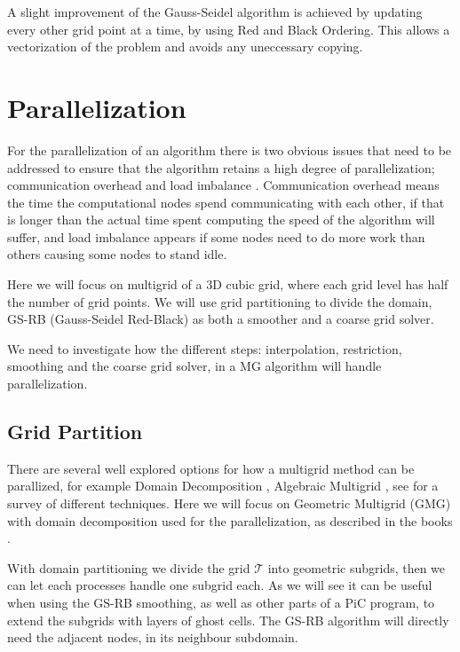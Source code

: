     A slight improvement of the Gauss-Seidel algorithm is achieved by updating
    every other grid point at a time, by using Red and Black Ordering.
    This allows a vectorization of the problem and avoids any uneccessary copying.

\section{Parallelization}
	For the parallelization of an algorithm there is two obvious issues that need
	to be addressed to ensure that the algorithm retains a high degree of parallelization;
	communication overhead and load imbalance \citep{hackbusch_multigrid_1982}.
  Communication overhead means the time the computational nodes spend communicating
  with each other, if that is longer than the actual time spent computing the speed
  of the algorithm will suffer, and load imbalance appears if some nodes need to
  do more work than others causing some nodes to stand idle.

	Here we will focus on multigrid of a 3D cubic grid, where each grid level has
  half the number of grid points. We will use grid
	partitioning to divide the domain, GS-RB (Gauss-Seidel Red-Black) as both a
	smoother and a coarse grid solver.

	We need to investigate how the different steps: interpolation, restriction,
	smoothing and the coarse grid solver, in a MG algorithm will handle parallelization.

	\subsection{Grid Partition}
		\label{sec:grid_partitioning}
		There are several well explored options for how a multigrid method can be
		parallized, for example Domain Decomposition \citep{arraras_domain_2015},
		Algebraic Multigrid \citep{stuben_review_2001}, see \citet{chow_survey_2006}
		for a survey of different techniques. Here we will focus on Geometric
		Multigrid (GMG) with domain decomposition used for the parallelization, as
		described in the books \cite{trottenberg_multigrid_2000, hackbusch_multigrid_1982}.

		With domain partitioning we divide the grid \(\mathcal{T}\) into geometric
		subgrids, then we can let each processes handle one subgrid each. As we will
		see it can be useful when using the GS-RB smoothing, as well as other parts
    of a PiC program, to extend the subgrids with layers of ghost cells. The GS-RB
    algorithm will directly need the adjacent nodes, in its neighbour subdomain.

